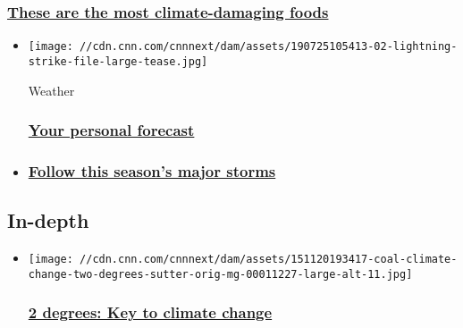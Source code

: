 \hypertarget{these-are-the-most-climate-damaging-foods-}{%
\subsubsection{\texorpdfstring{\href{/2017/05/15/world/climate-damaging-foods/index.html}{These
are the most climate-damaging foods
}}{These are the most climate-damaging foods }}\label{these-are-the-most-climate-damaging-foods-}}

\begin{itemize}
\item
  \href{https://www.cnn.com/weather}{}

  \texttt{[image: //cdn.cnn.com/cnnnext/dam/assets/190725105413-02-lightning-strike-file-large-tease.jpg]}

  Weather

  \hypertarget{your-personal-forecast}{%
  \subsubsection{\texorpdfstring{\href{https://www.cnn.com/weather}{Your
  personal
  forecast}}{Your personal forecast}}\label{your-personal-forecast}}
\item
  \hypertarget{follow-this-seasons-major-storms}{%
  \subsubsection{\texorpdfstring{\href{https://www.cnn.com/interactive/storm-tracker/}{Follow
  this season's major
  storms}}{Follow this season's major storms}}\label{follow-this-seasons-major-storms}}
\end{itemize}

\hypertarget{in-depth-}{%
\subsection{In-depth~}\label{in-depth-}}

\begin{itemize}
\item
  \href{http://www.cnn.com/specials/opinions/two-degrees}{}

  \texttt{[image: //cdn.cnn.com/cnnnext/dam/assets/151120193417-coal-climate-change-two-degrees-sutter-orig-mg-00011227-large-alt-11.jpg]}

  \hypertarget{2-degrees-key-to-climate-change}{%
  \subsubsection{\texorpdfstring{\href{http://www.cnn.com/specials/opinions/two-degrees}{2
  degrees: Key to climate
  change}}{2 degrees: Key to climate change}}\label{2-degrees-key-to-climate-change}}
\end{itemize}

